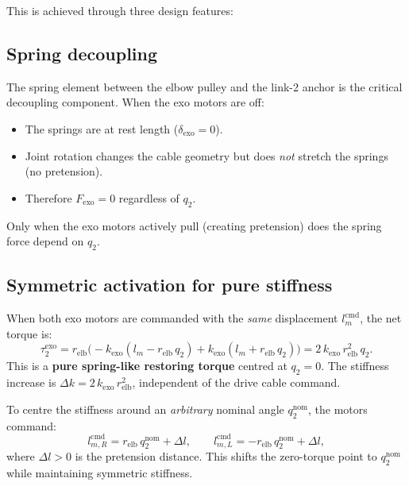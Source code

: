\documentclass[11pt, a4paper]{article}
\begin{document}
\noindent
This is achieved through three design features:

\subsection{Spring decoupling}

The spring element between the elbow pulley and the link-2 anchor is the
critical decoupling component.  When the exo motors are off:

\begin{itemize}
    \item The springs are at rest length ($\delta_{\text{exo}} = 0$).
    \item Joint rotation changes the cable geometry but does \emph{not}
          stretch the springs (no pretension).
    \item Therefore $F_{\text{exo}} = 0$ regardless of $q_2$.
\end{itemize}

\noindent
Only when the exo motors actively pull (creating pretension) does the spring
force depend on $q_2$.

\subsection{Symmetric activation for pure stiffness}

When both exo motors are commanded with the \emph{same} displacement
$l_m^{\text{cmd}}$, the net torque is:
%
\begin{equation}
    \tau_2^{\text{exo}}
    = r_{\text{elb}}\bigl(
        -k_{\text{exo}}(l_m - r_{\text{elb}}\,q_2)
        +k_{\text{exo}}(l_m + r_{\text{elb}}\,q_2)
      \bigr)
    = 2\,k_{\text{exo}}\,r_{\text{elb}}^2\,q_2.
\end{equation}
%
This is a \textbf{pure spring-like restoring torque} centred at $q_2 = 0$.
The stiffness increase is $\Delta k = 2\,k_{\text{exo}}\,r_{\text{elb}}^2$,
independent of the drive cable command.

To centre the stiffness around an \emph{arbitrary} nominal angle
$q_2^{\text{nom}}$, the motors command:
%
\begin{equation}
    l_{m,R}^{\text{cmd}} = r_{\text{elb}}\,q_2^{\text{nom}} + \Delta l, \qquad
    l_{m,L}^{\text{cmd}} = -r_{\text{elb}}\,q_2^{\text{nom}} + \Delta l,
\end{equation}
%
where $\Delta l > 0$ is the pretension distance.  This shifts the zero-torque
point to $q_2^{\text{nom}}$ while maintaining symmetric stiffness.
\end{document}
